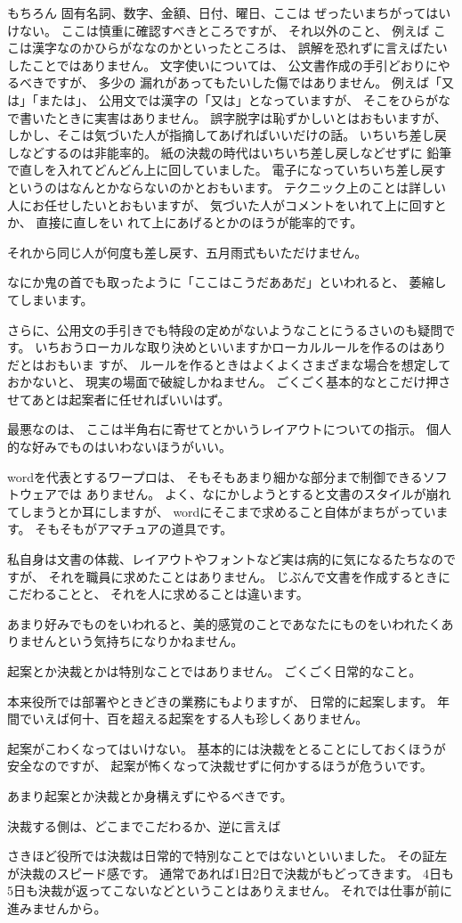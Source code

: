 \documentclass[uplatex,jis2004,dvipdfmx,12pt]{jsarticle}
\begin{document}
もちろん
固有名詞、数字、金額、日付、曜日、ここは
ぜったいまちがってはいけない。
ここは慎重に確認すべきところですが、
それ以外のこと、
例えば
ここは漢字なのかひらがななのかといったところは、
誤解を恐れずに言えばたいしたことではありません。
文字使いについては、
公文書作成の手引どおりにやるべきですが、
多少の
漏れがあってもたいした傷ではありません。
例えば「又は」「または」、
公用文では漢字の「又は」となっていますが、
そこをひらがなで書いたときに実害はありません。
誤字脱字は恥ずかしいとはおもいますが、
しかし、そこは気づいた人が指摘してあげればいいだけの話。
いちいち差し戻しなどするのは非能率的。
紙の決裁の時代はいちいち差し戻しなどせずに
鉛筆で直しを入れてどんどん上に回していました。
電子になっていちいち差し戻すというのはなんとかならないのかとおもいます。
テクニック上のことは詳しい人にお任せしたいとおもいますが、
気づいた人がコメントをいれて上に回すとか、
直接に直しをい
れて上にあげるとかのほうが能率的です。

それから同じ人が何度も差し戻す、五月雨式もいただけません。

なにか鬼の首でも取ったように「ここはこうだああだ」といわれると、
萎縮してしまいます。

さらに、公用文の手引きでも特段の定めがないようなことにうるさいのも疑問で
す。
いちおうローカルな取り決めといいますかローカルルールを作るのはありだとはおもいま
すが、
ルールを作るときはよくよくさまざまな場合を想定しておかないと、
現実の場面で破綻しかねません。
ごくごく基本的なとこだけ押させてあとは起案者に任せればいいはず。

最悪なのは、
ここは半角右に寄せてとかいうレイアウトについての指示。
個人的な好みでものはいわないほうがいい。


wordを代表とするワープロは、
そもそもあまり細かな部分まで制御できるソフトウェアでは
ありません。
よく、なにかしようとすると文書のスタイルが崩れてしまうとか耳にしますが、
wordにそこまで求めること自体がまちがっています。
そもそもがアマチュアの道具です。


私自身は文書の体裁、レイアウトやフォントなど実は病的に気になるたちなのですが、
それを職員に求めたことはありません。
じぶんで文書を作成するときにこだわることと、
それを人に求めることは違います。

あまり好みでものをいわれると、美的感覚のことであなたにものをいわれたくあ
りませんという気持ちになりかねません。


起案とか決裁とかは特別なことではありません。
ごくごく日常的なこと。

本来役所では部署やときどきの業務にもよりますが、
日常的に起案します。
年間でいえば何十、百を超える起案をする人も珍しくありません。

起案がこわくなってはいけない。
基本的には決裁をとることにしておくほうが安全なのですが、
起案が怖くなって決裁せずに何かするほうが危ういです。

あまり起案とか決裁とか身構えずにやるべきです。

決裁する側は、どこまでこだわるか、逆に言えば


さきほど役所では決裁は日常的で特別なことではないといいました。
その証左が決裁のスピード感です。
通常であれば1日2日で決裁がもどってきます。
4日も5日も決裁が返ってこないなどということはありえません。
それでは仕事が前に進みませんから。
\end{document}
